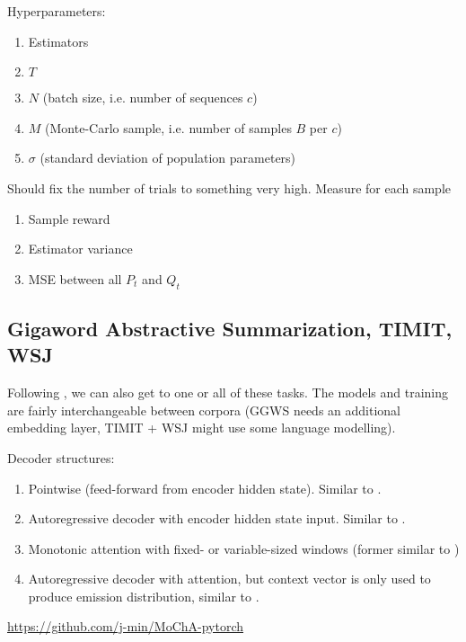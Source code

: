 \documentclass{article}
\begin{document}
Hyperparameters:
%
\begin{enumerate}
    \item Estimators
    \item $T$
    \item $N$ (batch size, i.e. number of sequences $c$)
    \item $M$ (Monte-Carlo sample, i.e. number of samples $B$ per $c$)
    \item $\sigma$ (standard deviation of population parameters)
\end{enumerate}
%
Should fix the number of trials to something very high. Measure for each sample
%
\begin{enumerate}
    \item Sample reward
    \item Estimator variance
    \item MSE between all $P_t$ and $Q_t$
\end{enumerate}
%

\subsection{Gigaword Abstractive Summarization, TIMIT, WSJ}

Following \citet{raffelOnlineLineartimeAttention2017}, we can also get to
one or all of these tasks. The models and training are fairly interchangeable
between corpora (GGWS needs an additional embedding layer, TIMIT + WSJ might
use some language modelling).

Decoder structures:
%
\begin{enumerate}
    \item Pointwise (feed-forward from encoder hidden state). Similar to
          \citet{luoLearningOnlineAlignments2017,lawsonLearningHardAlignments2018}.
    \item Autoregressive decoder with encoder hidden state input. Similar to
          \citet{raffelOnlineLineartimeAttention2017}.
    \item Monotonic attention with fixed- or variable-sized windows
          (former similar to \citet{chiuMonotonicChunkwiseAttention2018})
    \item Autoregressive decoder with attention, but context vector is only
          used to produce emission distribution, similar to
          \citet{wuHardNonmonotonicAttention10,wuExactHardMonotonic2019}.
\end{enumerate}
%

\url{https://github.com/j-min/MoChA-pytorch}



\end{document}
